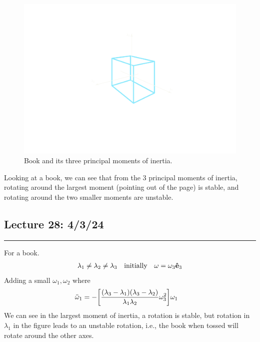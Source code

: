 \documentclass[../main.tex]{subfiles}
\begin{document}
\newpage 
\begin{figure}[ht]
    \centering
    \includegraphics[width=0.8\linewidth]{book.png}
    \caption{Book and its three principal moments of inertia.}
\end{figure}

Looking at a book, we can see that from the 3 principal moments of inertia, rotating around the 
largest moment (pointing out of the page) is stable, and rotating around the two smaller moments are
unstable. 

\newpage
\subsection*{Lecture 28: \hfill 4/3/24}
\hrule \vspace{10px}
For a book.
\begin{align*}
    \lambda_1 \neq \lambda_2 \neq \lambda_3 \qqtext{initially} \vb \omega = \omega_3 \vu e_3
\end{align*}
Adding a small $\omega_1, \omega_2$ where
\begin{align*}
    \ddot \omega_1 &= -\qt[\frac{(\lambda_3 - \lambda_1)(\lambda_3 - \lambda_2)}{\lambda_1 \lambda_2}\omega_3^2] \omega_1
\end{align*}
We can see in the largest moment of inertia, a rotation is stable, but rotation in $\lambda_1$ in the figure
leads to an unstable rotation, i.e., the book when tossed will rotate around the other axes.
\end{document}

